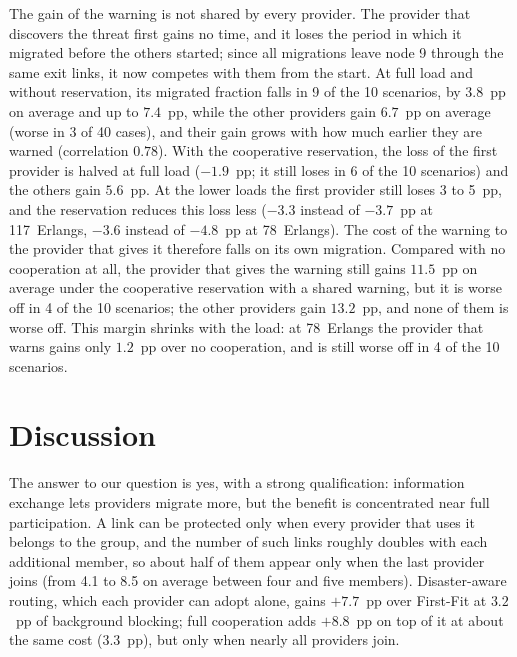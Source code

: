 \documentclass[11pt,a4paper]{article}
\theoremstyle{definition}
\begin{document}
The gain of the warning is not shared by every provider.
The provider that discovers the threat first gains no time, and it loses the period in which it migrated before the others started; since all migrations leave node 9 through the same exit links, it now competes with them from the start.
At full load and without reservation, its migrated fraction falls in 9 of the 10 scenarios, by $3.8$~pp on average and up to $7.4$~pp, while the other providers gain $6.7$~pp on average (worse in 3 of 40 cases), and their gain grows with how much earlier they are warned (correlation $0.78$).
With the cooperative reservation, the loss of the first provider is halved at full load ($-1.9$~pp; it still loses in 6 of the 10 scenarios) and the others gain $5.6$~pp.
At the lower loads the first provider still loses 3 to 5~pp, and the reservation reduces this loss less ($-3.3$ instead of $-3.7$~pp at 117~Erlangs, $-3.6$ instead of $-4.8$~pp at 78~Erlangs).
The cost of the warning to the provider that gives it therefore falls on its own migration.
Compared with no cooperation at all, the provider that gives the warning still gains $11.5$~pp on average under the cooperative reservation with a shared warning, but it is worse off in 4 of the 10 scenarios; the other providers gain $13.2$~pp, and none of them is worse off.
This margin shrinks with the load: at 78~Erlangs the provider that warns gains only $1.2$~pp over no cooperation, and is still worse off in 4 of the 10 scenarios.

\section{Discussion}
\label{sec:discussion}

The answer to our question is yes, with a strong qualification: information exchange lets providers migrate more, but the benefit is concentrated near full participation.
A link can be protected only when every provider that uses it belongs to the group, and the number of such links roughly doubles with each additional member, so about half of them appear only when the last provider joins (from 4.1 to 8.5 on average between four and five members).
Disaster-aware routing, which each provider can adopt alone, gains $+7.7$~pp over First-Fit at $3.2$~pp of background blocking; full cooperation adds $+8.8$~pp on top of it at about the same cost ($3.3$~pp), but only when nearly all providers join.
\end{document}
